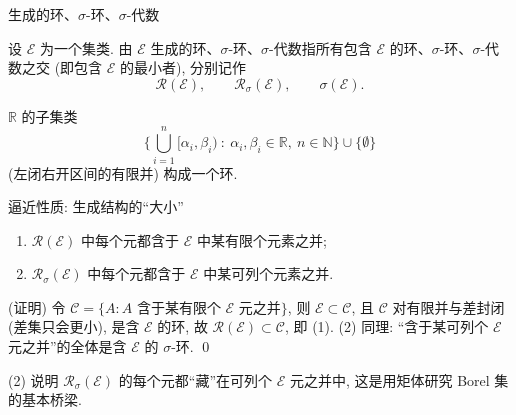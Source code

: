 
\begin{frame}{生成的环、$\sigma$-环、$\sigma$-代数}

\begin{Def}[生成结构]
设 $\mathscr{E}$ 为一个集类. \alert{由 $\mathscr{E}$ 生成的环、$\sigma$-环、$\sigma$-代数}指所有包含 $\mathscr{E}$ 的环、$\sigma$-环、$\sigma$-代数之\alert{交} (即包含 $\mathscr{E}$ 的\alert{最小}者), 分别记作
\[
\mathscr{R}(\mathscr{E}), \qquad \mathscr{R}_\sigma(\mathscr{E}), \qquad \sigma(\mathscr{E}).
\]
\end{Def}

\pause

\begin{eg}
$\mathbb{R}$ 的子集类
\[
\Big\{ \bigcup_{i=1}^n [\alpha_i, \beta_i)\ :\ \alpha_i, \beta_i \in \mathbb{R},\ n \in \mathbb{N} \Big\} \cup \{\emptyset\}
\]
(左闭右开区间的有限并) 构成一个\alert{环}.
\end{eg}

\end{frame}


\begin{frame}{逼近性质: 生成结构的``大小''}

\begin{thm}[逼近性质]
\begin{enumerate}
\item $\mathscr{R}(\mathscr{E})$ 中每个元都含于 $\mathscr{E}$ 中\alert{某有限个}元素之并;
\item $\mathscr{R}_\sigma(\mathscr{E})$ 中每个元都含于 $\mathscr{E}$ 中\alert{某可列个}元素之并.
\end{enumerate}
\end{thm}

\pause

\startproof[bg=yellow, fg=red](证明)
令 $\mathscr{C} = \{A : A$ 含于某有限个 $\mathscr{E}$ 元之并$\}$, 则 $\mathscr{E} \subset \mathscr{C}$, 且 $\mathscr{C}$ 对有限并与差封闭 (差集只会更小), 是含 $\mathscr{E}$ 的环, 故 $\mathscr{R}(\mathscr{E}) \subset \mathscr{C}$, 即 (1). (2) 同理: ``含于某可列个 $\mathscr{E}$ 元之并''的全体是含 $\mathscr{E}$ 的 $\sigma$-环.
\qed

\pause

\begin{remark}
(2) 说明 $\mathscr{R}_\sigma(\mathscr{E})$ 的每个元都``藏''在可列个 $\mathscr{E}$ 元之并中, 这是用矩体研究 Borel 集的基本桥梁.
\end{remark}

\end{frame}

